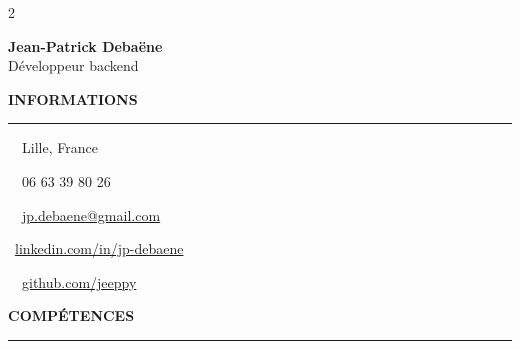 \documentclass[a4paper,10pt]{article}
\newcommand{\lsection}[1]{%
  \vspace{18pt}%
  {\color{white}\bfseries\uppercase{#1}}%
  \par\vspace{-4pt}%
  {\color{white!50!sidecolor}\rule{\linewidth}{0.5pt}}%
  \vspace{4pt}%
}
\begin{document}
\setlength{\columnsep}{0pt}

\begin{paracol}{2}

\begin{leftcolumn}
\hspace*{10pt}%
\begin{minipage}[t]{\dimexpr\linewidth-20pt}

\vspace*{5pt}
\begin{center}
  {\color{white}\large\bfseries Jean-Patrick Debaëne}\\[4pt]
  {\color{white!70!sidecolor}\large Développeur backend}
\end{center}

\lsection{Informations}

{\color{textside}
  \faMapMarker*\ \ Lille, France \par\vspace{3pt}
  \faPhone\ \ 06 63 39 80 26 \par\vspace{3pt}
  \faEnvelope\ \ \href{mailto:jp.debaene@gmail.com}{\color{textside}jp.debaene@gmail.com} \par\vspace{3pt}
  \faLinkedinIn\ \href{https://www.linkedin.com/in/jp-debaene}{\color{textside}linkedin.com/in/jp-debaene} \par\vspace{3pt}
  \faGithub\ \ \href{https://github.com/jeeppy}{\color{textside}github.com/jeeppy}
}

\lsection{Compétences}


\end{minipage}
\end{leftcolumn}
\end{paracol}
\end{document}
